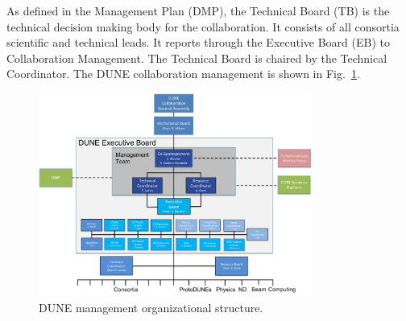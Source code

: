As defined in the  Management Plan (DMP), the 
Technical Board (TB) is the technical decision making body for the
collaboration. It consists of all consortia scientific and technical
leads. It reports through the Executive Board (EB) to Collaboration
Management. The  Technical Board is chaired by the
Technical Coordinator. The DUNE collaboration management is shown in
Fig.~\ref{fig:DUNE_org}.
\begin{figure}[htb]
  \begin{center}
    \includegraphics[width=0.8\textwidth]{far-detector-generic/figures/DUNE_mgmt}
    \caption{DUNE management organizational structure.}
    \label{fig:DUNE_org}
  \end{center}
\end{figure}



